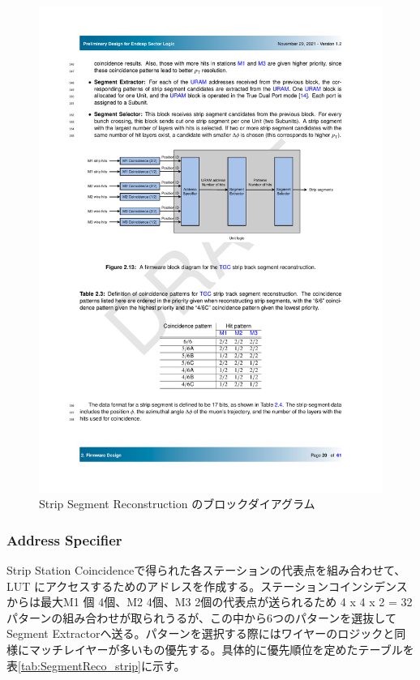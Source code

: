 \begin{figure} 
\centering
\includegraphics[width=16cm]{fig/SL/SegReco_strip.pdf}
\caption[Strip Segment Reconstruction のブロックダイアグラム]{Strip Segment Reconstruction のブロックダイアグラム}
\label{SegReco_strip}
\end{figure}

\subsubsection*{Address Specifier}
Strip Station Coincidenceで得られた各ステーションの代表点を組み合わせて、LUT にアクセスするためのアドレスを作成する。ステーションコインシデンスからは最大M1 個 4個、M2 4個、M3 2個の代表点が送られるため  4 x 4 x 2 = 32 パターンの組み合わせが取られうるが、この中から6つのパターンを選抜してSegment Extractorへ送る。パターンを選択する際にはワイヤーのロジックと同様にマッチレイヤーが多いもの優先する。具体的に優先順位を定めたテーブルを表\ref{tab:SegmentReco_strip}に示す。

